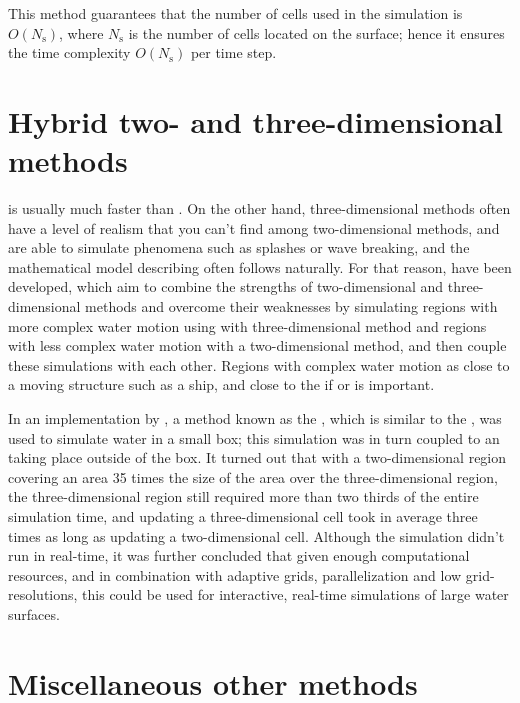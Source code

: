 This method guarantees that the number of cells used in the simulation is $O(N_{\text{s}})$, where $N_{\text{s}}$ is the number of cells located on the surface; hence it ensures the time complexity $O(N_{\text{s}})$ per time step.

\section{Hybrid two- and three-dimensional methods}

 is usually much faster than . On the other hand, three-dimensional methods often have a level of realism that you can't find among two-dimensional methods, and are able to simulate phenomena such as splashes or wave breaking, and the mathematical model describing \FSI often follows naturally. For that reason,  have been developed, which aim to combine the strengths of two-dimensional and three-dimensional methods and overcome their weaknesses by simulating regions with more complex water motion using with three-dimensional method and regions with less complex water motion with a two-dimensional method, and then couple these simulations with each other. Regions with complex water motion as close to a moving structure such as a ship, and close to the \shoreline if  or  is important.

In an implementation by \citet{Thurey2006}, a method known as the , which is similar to the \FVM, was used to simulate water in a small box; this simulation was in turn coupled to an \SWS taking place outside of the box. It turned out that with a two-dimensional region covering an area 35 times the size of the area over the three-dimensional region, the three-dimensional region still required more than two thirds of the entire simulation time, and updating a three-dimensional cell took in average three times as long as updating a two-dimensional cell. Although the simulation didn't run in real-time, it was further concluded that given enough computational resources, and in combination with adaptive grids, parallelization and low grid-resolutions, this could be used for interactive, real-time simulations of large water surfaces.

\section{Miscellaneous other methods}

